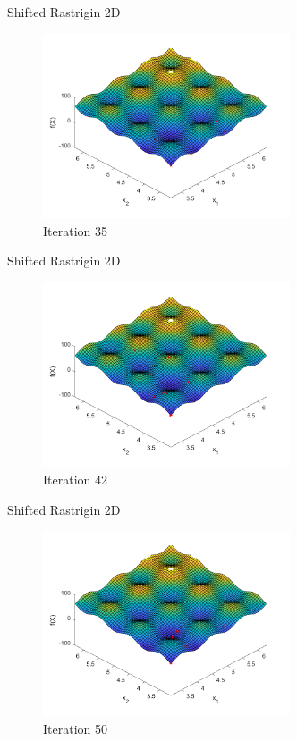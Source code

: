 \documentclass[xcolor=table]{beamer}
\begin{document}
\begin{frame}{Shifted Rastrigin 2D}
  \begin{figure}[h]
  \begin{center}
    \includegraphics[width=0.65\textwidth]{img/smpl/rast2dshft/loa-iter-35}
    \caption{Iteration 35}
  \end{center}
  \end{figure}
\end{frame}
\begin{frame}{Shifted Rastrigin 2D}
  \begin{figure}[h]
  \begin{center}
    \includegraphics[width=0.65\textwidth]{img/smpl/rast2dshft/loa-iter-42}
    \caption{Iteration 42}
  \end{center}
  \end{figure}
\end{frame}
\begin{frame}{Shifted Rastrigin 2D}
  \begin{figure}[h]
  \begin{center}
    \includegraphics[width=0.65\textwidth]{img/smpl/rast2dshft/loa-iter-50}
    \caption{Iteration 50}
  \end{center}
  \end{figure}
\end{frame}
\end{document}
